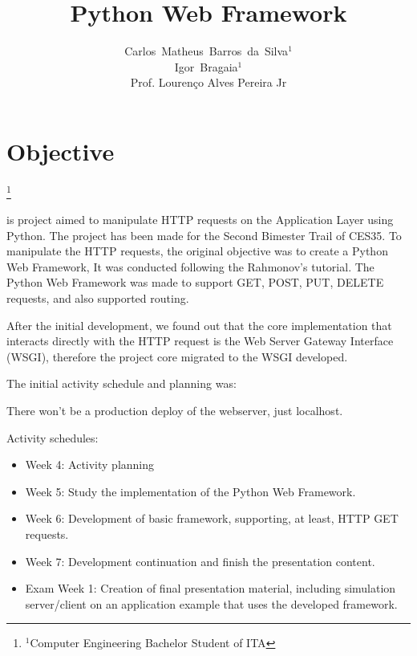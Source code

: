 \documentclass[journal,12pt,onecolumn,draftclsnofoot,]{IEEEtran}
\newcommand\blfootnote[1]{%
  \begingroup
  \renewcommand\thefootnote{}\footnote{#1}%
  \addtocounter{footnote}{-1}%
  \endgroup
}
\begin{document}
\title{Python Web Framework}
\author{Carlos~Matheus~Barros~da~Silva$^1$
\\
Igor~Bragaia$^1$
\\
Prof. Lourenço Alves Pereira Jr}
\maketitle

\IEEEpeerreviewmaketitle



\section{Objective}
\blfootnote{$^1$Computer Engineering Bachelor Student of ITA}

is project aimed to manipulate HTTP requests on the Application Layer using Python. The project has been made for the Second Bimester Trail of CES35. To manipulate the HTTP requests, the original objective was to create a Python Web Framework, It was conducted following the Rahmonov's tutorial\cite{c1}\cite{c2}\cite{c3}. The Python Web Framework was made to support GET, POST, PUT, DELETE requests, and also supported routing.

After the initial development, we found out that the core implementation that interacts directly with the HTTP request is the Web Server Gateway Interface (WSGI), therefore the project core migrated to the WSGI developed.

The initial activity schedule and planning was:

There won't be a production deploy of the webserver, just localhost.

Activity schedules:

\begin{itemize}
    \item Week 4: Activity planning
    \item Week 5: Study the implementation of the Python Web Framework.
    \item Week 6: Development of basic framework, supporting, at least, HTTP GET requests.
    \item Week 7: Development continuation and finish the presentation content.
    \item Exam Week 1: Creation of final presentation material, including simulation server/client on an application example that uses the developed framework.
\end{itemize}
\end{document}
